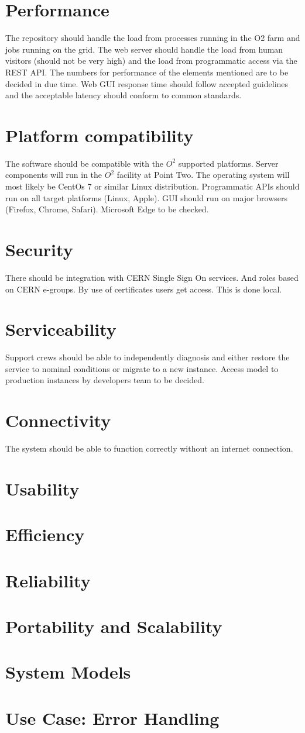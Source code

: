 \section{Performance}
The repository should handle the load from processes running in the O2 farm and jobs running on the grid. The web server should handle the load from human visitors (should not be very high) and the load from programmatic access via the REST API. The numbers for performance of the elements mentioned are to be decided in due time. Web GUI response time should follow accepted guidelines and the acceptable latency should conform to common standards.

\section{Platform compatibility}
The software should be compatible with the $O^2$ supported platforms. Server components will run in the $O^2$ facility at Point Two. The operating system will most likely be CentOs 7 or similar Linux distribution. Programmatic APIs should run on all target platforms (Linux, Apple). GUI should run on major browsers (Firefox, Chrome, Safari). Microsoft Edge to be checked.

\section{Security}
There should be integration with CERN Single Sign On services. And roles based on CERN e-groups. By use of certificates users get access. This is done local.

\section{Serviceability}
Support crews should be able to independently diagnosis and either restore the service to nominal conditions or migrate to a new instance. Access model to production instances by developers team to be decided.

\section{Connectivity}
The system should be able to function correctly without an internet connection.

\section{Usability}

\section{Efficiency}
\section{Reliability}
\section{Portability and Scalability}
\section{System Models}
\section{Use Case: Error Handling}
